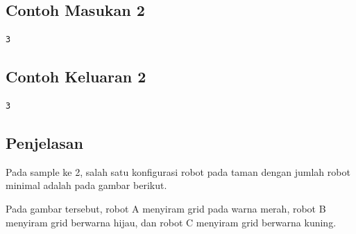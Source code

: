\documentclass{article}
\begin{document}
\begin{multicols}{2}
\subsection*{Contoh Masukan 2}
\begin{lstlisting}
3
\end{lstlisting}
\null
\columnbreak
\subsection*{Contoh Keluaran 2}
\begin{lstlisting}
3
\end{lstlisting}
\vfill
\null
\end{multicols}
\subsection*{Penjelasan}
Pada sample ke 2, salah satu konfigurasi robot pada taman dengan  jumlah robot minimal adalah pada gambar berikut. 


\begin{center}
\end{center}

Pada gambar tersebut, robot A menyiram grid pada warna merah, robot B menyiram grid berwarna hijau, dan robot C menyiram grid berwarna kuning.
\end{document}
